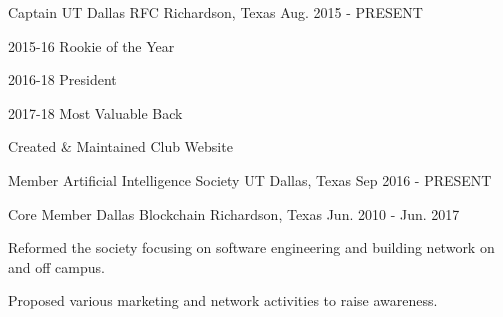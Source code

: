 

\begin{cventries}

  \cventry
    {Captain} %
    {UT Dallas RFC} %
    {Richardson, Texas} %
    {Aug. 2015 - PRESENT} %
    {
      \begin{cvitems} %
        \item {2015-16 Rookie of the Year}
        \item {2016-18 President}
        \item {2017-18 Most Valuable Back}
        \item {Created \& Maintained Club Website}
      \end{cvitems}
    }

  \cventry
    {Member} %
    {Artificial Intelligence Society} %
    {UT Dallas, Texas} %
    {Sep 2016 - PRESENT} %
    {
      \begin{cvitems} %
      \end{cvitems}
    }

  \cventry
    {Core Member} %
    {Dallas Blockchain} %
    {Richardson, Texas} %
    {Jun. 2010 - Jun. 2017} %
    {
      \begin{cvitems} %
        \item {Reformed the society focusing on software engineering and building network on and off campus.}
        \item {Proposed various marketing and network activities to raise awareness.}
      \end{cvitems}
    }


\end{cventries}
